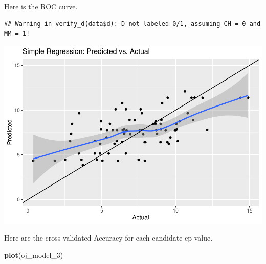 \documentclass[
]{book}
\newenvironment{Shaded}{\begin{snugshade}}{\end{snugshade}}
\newcommand{\DataTypeTok}[1]{\textcolor[rgb]{0.13,0.29,0.53}{#1}}
\newcommand{\DecValTok}[1]{\textcolor[rgb]{0.00,0.00,0.81}{#1}}
\newcommand{\FloatTok}[1]{\textcolor[rgb]{0.00,0.00,0.81}{#1}}
\newcommand{\KeywordTok}[1]{\textcolor[rgb]{0.13,0.29,0.53}{\textbf{#1}}}
\newcommand{\NormalTok}[1]{#1}
\newcommand{\OperatorTok}[1]{\textcolor[rgb]{0.81,0.36,0.00}{\textbf{#1}}}
\newcommand{\StringTok}[1]{\textcolor[rgb]{0.31,0.60,0.02}{#1}}
\begin{document}
Here is the ROC curve.

\begin{Shaded}
\end{Shaded}

\begin{verbatim}
## Warning in verify_d(data$d): D not labeled 0/1, assuming CH = 0 and MM = 1!
\end{verbatim}

\includegraphics{data-sci_files/figure-latex/unnamed-chunk-77-1.pdf}

Here are the cross-validated Accuracy for each candidate cp value.

\begin{Shaded}
\begin{Highlighting}[]
\KeywordTok{plot}\NormalTok{(oj_model_}\DecValTok{3}\NormalTok{)}
\end{Highlighting}
\end{Shaded}
\end{document}
